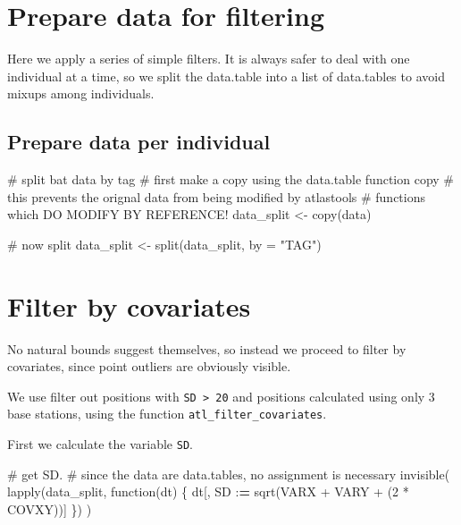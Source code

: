 \documentclass[]{scrreprt}
\newenvironment{Shaded}{}{}
\newcommand{\CommentTok}[1]{\textcolor[rgb]{0.00,0.50,0.00}{#1}}
\newcommand{\ControlFlowTok}[1]{\textcolor[rgb]{0.00,0.00,1.00}{#1}}
\newcommand{\DataTypeTok}[1]{#1}
\newcommand{\DecValTok}[1]{#1}
\newcommand{\ErrorTok}[1]{\textcolor[rgb]{1.00,0.00,0.00}{\textbf{#1}}}
\newcommand{\KeywordTok}[1]{\textcolor[rgb]{0.00,0.00,1.00}{#1}}
\newcommand{\NormalTok}[1]{#1}
\newcommand{\OperatorTok}[1]{#1}
\newcommand{\StringTok}[1]{\textcolor[rgb]{0.00,0.50,0.50}{#1}}
\begin{document}
\hypertarget{prepare-data-for-filtering}{%
\section{Prepare data for filtering}\label{prepare-data-for-filtering}}

Here we apply a series of simple filters.
It is always safer to deal with one individual at a time, so we split the data.table
into a list of data.tables to avoid mixups among individuals.

\hypertarget{prepare-data-per-individual}{%
\subsection{Prepare data per individual}\label{prepare-data-per-individual}}

\begin{Shaded}
\begin{Highlighting}[]
\CommentTok{# split bat data by tag}
\CommentTok{# first make a copy using the data.table function copy}
\CommentTok{# this prevents the orignal data from being modified by atlastools}
\CommentTok{# functions which DO MODIFY BY REFERENCE!}
\NormalTok{data_split <-}\StringTok{ }\KeywordTok{copy}\NormalTok{(data)}

\CommentTok{# now split}
\NormalTok{data_split <-}\StringTok{ }\KeywordTok{split}\NormalTok{(data_split, }\DataTypeTok{by =} \StringTok{"TAG"}\NormalTok{)}
\end{Highlighting}
\end{Shaded}

\hypertarget{filter-by-covariates}{%
\section{Filter by covariates}\label{filter-by-covariates}}

No natural bounds suggest themselves, so instead we proceed to filter by covariates, since point outliers are obviously visible.

We use filter out positions with \texttt{SD\ \textgreater{}\ 20} and positions calculated using only 3 base stations, using the function \texttt{atl\_filter\_covariates}.

First we calculate the variable \texttt{SD}.

\begin{Shaded}
\begin{Highlighting}[]
\CommentTok{# get SD.}
\CommentTok{# since the data are data.tables, no assignment is necessary}
\KeywordTok{invisible}\NormalTok{(}
  \KeywordTok{lapply}\NormalTok{(data_split, }\ControlFlowTok{function}\NormalTok{(dt) \{}
\NormalTok{    dt[, SD }\OperatorTok{:}\ErrorTok{=}\StringTok{ }\KeywordTok{sqrt}\NormalTok{(VARX }\OperatorTok{+}\StringTok{ }\NormalTok{VARY }\OperatorTok{+}\StringTok{ }\NormalTok{(}\DecValTok{2} \OperatorTok{*}\StringTok{ }\NormalTok{COVXY))]}
\NormalTok{  \})}
\NormalTok{)}
\end{Highlighting}
\end{Shaded}
\end{document}
